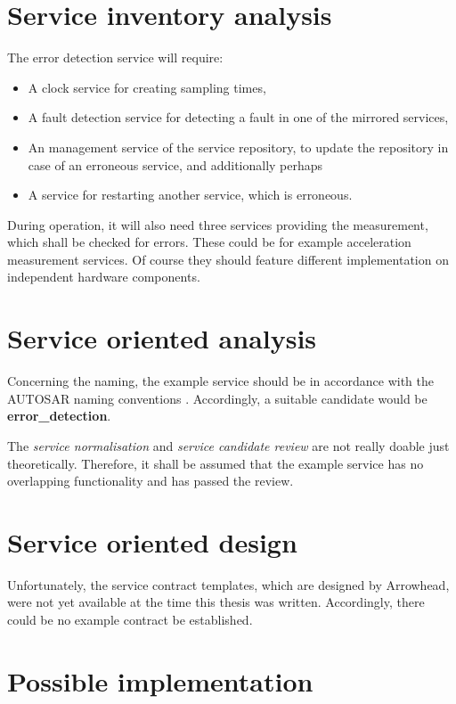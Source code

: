 \section{Service inventory analysis}


The error detection service will require:
\begin{itemize}
\item A clock service for creating sampling times,
\item A fault detection service for detecting a fault in one of the mirrored services,
\item An management service of the service repository, to update the repository in case of an erroneous service, and additionally perhaps
\item A service for restarting another service, which is erroneous.
\end{itemize}

During operation, it will also need three services providing the measurement, which shall be checked for errors. These could be for example acceleration measurement services. Of course they should feature different implementation on independent hardware components.


\section{Service oriented analysis}


Concerning the naming, the example service should be in accordance with the AUTOSAR naming conventions \cite{autosar_system_modelling}. Accordingly, a suitable candidate would be \textbf{error\_detection}.

The \emph{service normalisation} and \emph{service candidate review} are not really doable just theoretically. Therefore, it shall be assumed that the example service has no overlapping functionality and has passed the review.





\section{Service oriented design}

Unfortunately, the service contract templates, which are designed by Arrowhead, were not yet available at the time this thesis was written. Accordingly, there could be no example contract be established.


\section{Possible implementation}

